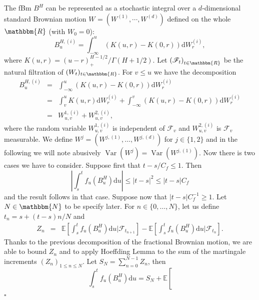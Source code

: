 \documentclass[a4paper,11pt]{article}
\newcommand{\mathd}{\mathrm{d}}
\newcommand{\nobracket}{}
\newcommand{\nocomma}{}
\newcommand{\nosymbol}{}
\newcommand{\tmop}[1]{\ensuremath{\operatorname{#1}}}
\newenvironment{proof}{{\sc Proof.}}{\hfill$\square$}
\newcommand{\CF}{\mathscr F}
\begin{document}
\begin{proof}
  The fBm $B^{H}$ can be represented as a stochastic integral over a
  $d$-dimensional standard Brownian motion $W_{\nosymbol} = (W^{(1)} , \cdots
  , \nocomma W^{(d)} )$ defined on the whole $\mathbbm{R}$ (with $W_{0} =0$):
  \[ B^{H, ( i )}_{u} = \int_{- \infty}^{u} ( K ( u,r ) -K ( 0,r ) ) \mathd
     W^{( i )}_{r} , \]
  where $K ( u,r ) = ( u-r )_{+}^{\nosymbol H-1/2} / \Gamma ( H+1/2 )$. Let
  $\left( \CF_{t} \right)_{t \in \mathbbm{R}}$ be the natural filtration of $(
  W_{t} )_{t \in \mathbbm{R}}$. For $v \leqslant u$ we have the decomposition
  \begin{eqnarray*}
    B^{H, ( i )}_{u} & = & \int_{- \infty}^{u} ( K ( u,r ) -K ( 0,r ) ) \mathd
    W^{( i )}_{r}\\
    & = & \int_{v}^{u} K ( u,r ) \mathd W^{( i )}_{r} + \int_{- \infty}^{v} (
    K ( u,r ) -K ( 0,r ) ) \mathd W^{( i )}_{r}\\
    & = & W_{u,v}^{1, ( i )} +W_{u,v}^{2, ( i )},
  \end{eqnarray*}
  where the random variable $W_{u,v}^{1, ( i )}$ is independent of
  $\mathcal{F}_{v}$ and $W_{u,v}^{2, ( i )}$ is $\mathcal{F}_{v}$ measurable.
  We define $W^{j} = (W^{j, ( 1 )} , \ldots ,W^{j, ( d )} )$ for $j \in \{ 1,2
  \}$ and in the following we will note abusively
  $ \tmop{Var} ( W^{j} ) = \tmop{Var} (W^{j, ( 1 )} ) $.
  Now there is two cases we have to consider. Suppose first that $t-s/C_{f}
  \leqslant 1$. Then
  \[ \left\lvert \int_{s}^{t} f_{u} ( B^{H}_{u} ) \mathd u \right\lvert \leqslant | t-s
     |^{2} \leqslant | t-s | C_{f} \]
  and the result follows in that case. Suppose now that $| t-s | C_{f}^{-1}
  \geqslant 1$. Let $N \in \mathbbm{N}$ to be specify later. For $n \in \{ 0,
  \ldots ,N \}$, let us define \ $t_{n} =s+ ( t-s ) n/N$ and
  \begin{eqnarray*}
    Z_{n} & = & \mathbb{E} \left[ \int_{s}^{t} f_{u} ( B^{H}_{u} )  \text{d} u
    | \mathcal{F}_{t_{n+1}} \nobracket \right] - \mathbb{E} \left[
    \int_{s}^{t} f_{u} ( B^{H}_{u} )  \text{d} u | \mathcal{F}_{t_{n}}
    \nobracket \right] .
  \end{eqnarray*}
  Thanks to the previous decomposition of the fractional Brownian motion, we
  are able to bound $Z_{n}$ and to apply Hoeffding Lemma to the sum of the
  martingale increments $(Z_{n} )_{1 \leqslant n \leqslant N}$. Let $S_{N} =
  \sum_{n=0}^{N-1} Z_{n}$, then
  \begin{equation}
    \int_{s}^{t} f_{u} ( B^{H}_{u} ) \mathd u=S_{N} + \mathbb{E} \left[

\end{equation}
\end{proof}
\end{document}
